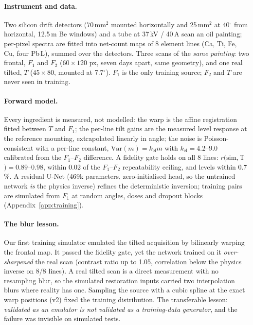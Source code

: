 \documentclass{article}
\newcommand{\Fone}{$F_1$}
\newcommand{\Ftwo}{$F_2$}
\newcommand{\Treal}{$T$}
\begin{document}
\paragraph{Instrument and data.} Two silicon drift detectors (70\,mm$^2$ mounted horizontally and 25\,mm$^2$ at 40$^\circ$ from horizontal, 12.5\,\textmu m Be windows) and a tube at 37\,kV / 40\,\textmu A scan an oil painting; per-pixel spectra are fitted into net-count maps of 8 element lines (Ca, Ti, Fe, Cu, four Pb\,L), summed over the detectors. Three scans of the \emph{same painting}: two frontal, \Fone{} and \Ftwo{} ($60\times120$ px, seven days apart, same geometry), and one real tilted, \Treal{} ($45\times80$, mounted at 7.7$^\circ$). \Fone{} is the only training source; \Ftwo{} and \Treal{} are never seen in training.

\paragraph{Forward model.} Every ingredient is measured, not modelled: the warp is the affine registration fitted between \Treal{} and \Fone{}; the per-line tilt gains are the measured level response at the reference mounting, extrapolated linearly in angle; the noise is Poisson-consistent with a per-line constant, $\mathrm{Var}(m) = k_{\mathrm{el}} m$ with $k_{\mathrm{el}}\!=\!4.2$--$9.0$ calibrated from the \Fone{}--\Ftwo{} difference. A fidelity gate holds on all 8 lines: $r(\mathrm{sim},\Treal{}) = 0.89$--$0.98$, within 0.02 of the \Fone{}--\Ftwo{} repeatability ceiling, and levels within 0.7\,\%. A residual U-Net \citep{ronneberger2015} (469k parameters, zero-initialised head, so the untrained network \emph{is} the physics inverse) refines the deterministic inversion; training pairs are simulated from \Fone{} at random angles, doses and dropout blocks (Appendix~\ref{app:training}).

\paragraph{The blur lesson.} Our first training simulator emulated the tilted acquisition by bilinearly warping the frontal map. It passed the fidelity gate, yet the network trained on it \emph{over-sharpened} the real scan (contrast ratio up to 1.05, correlation below the physics inverse on 8/8 lines). A real tilted scan is a direct measurement with no resampling blur, so the simulated restoration inputs carried two interpolation blurs where reality has one. Sampling the source with a cubic spline at the exact warp positions (v2) fixed the training distribution. The transferable lesson: \emph{validated as an emulator is not validated as a training-data generator}, and the failure was invisible on simulated tests.
\end{document}
